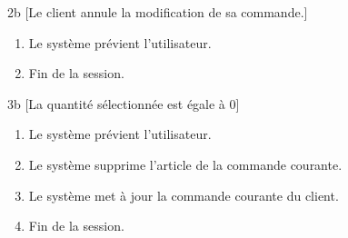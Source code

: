 		2b [Le client annule la modification de sa commande.]
			\begin{enumerate}[label=2b.\arabic* ]
				\item Le système prévient l'utilisateur.
				\item Fin de la session.
			\end{enumerate}
		3b [La quantité sélectionnée est égale à 0]
			\begin{enumerate}[label=3b.\arabic* ]
				\item Le système prévient l'utilisateur.
				\item Le système supprime l'article de la commande courante.
				\item Le système met à jour la commande courante du client.
				\item Fin de la session.
			\end{enumerate}
